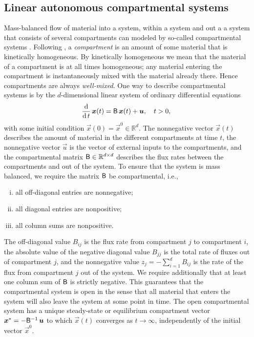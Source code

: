 \documentclass[smallextended]{svjour3}
\makeatletter
\renewcommand*{\eqref}[1]{%
  \hyperref[{#1}]{\textup{\tagform@{\ref*{#1}}}}%
}
\newcommand{\R}{\mathbb{R}}
\newcommand{\deriv}[1]{\frac{\operatorname{d}}{\operatorname{d}#1}}
\makeatother
\begin{document}
\subsection{Linear autonomous compartmental systems}\label{sec:one_particle}
Mass-balanced flow of material into a system, within a system and out a a system that consists of several compartments can modeled by so-called compartmental systems \citep{Anderson1983}.
Following \citet{Jacquez1993SIAM}, a \emph{compartment} is an amount of some material that is kinetically homogeneous.
By kinetically homogeneous we mean that the material of a compartment is at all times homogeneous; any material entering the compartment is instantaneously mixed with the material already there.
Hence compartments are always \emph{well-mixed}.
One way to describe compartmental systems is by the $d$-dimensional linear system of ordinary differential equations 
\begin{equation}\label{eqn:lin_CS_sys}
  \deriv{t}\,\vec{x}(t) = \tens{B}\,\vec{x}(t) + \vec{u},\quad t>0,\\
\end{equation}
with some initial condition $\vec{x}(0) = \vec{x}^0\in\R^d$.
The nonnegative vector $\vec{x}(t)$ describes the amount of material in the different compartments at time $t$, the nonnegative vector $\vec{u}$ is the vector of external inputs to the compartments, and the compartmental matrix $\tens{B}\in\R^{d\times d}$ describes the flux rates between the compartments and out of the system.
To ensure that the system is mass balanced, we require the matrix $\mathsf{B}$ be compartmental, i.e., 
\begin{enumerate}[(i)]
    \item all off-diagonal entries are nonnegative;
    \item all diagonal entries are nonpositive;
    \item all column sums are nonpositive.
\end{enumerate}
The off-diagonal value $B_{ij}$ is the flux rate from compartment $j$ to compartment $i$, the absolute value of the negative diagonal value $B_{jj}$ is the total rate of fluxes out of compartment $j$, and the nonnegative value $z_j=-\sum_{i=1}^d B_{ij}$ is the rate of the flux from compartment $j$ out of the system.
We require additionally that at least one column sum of $\mathsf{B}$ is strictly negative.
This guarantees that the compartmental system is open in the sense that all material that enters the system will also leave the system at some point in time.
The open compartmental system \eqref{eqn:lin_CS_sys} has a unique steady-state or equilibrium compartment vector $\vec{x}^\ast = -\tens{B}^{-1}\,\vec{u}$ to which $\vec{x}(t)$ converges as $t\to\infty$, independently of the initial vector $\vec{x}^0$.
\end{document}
